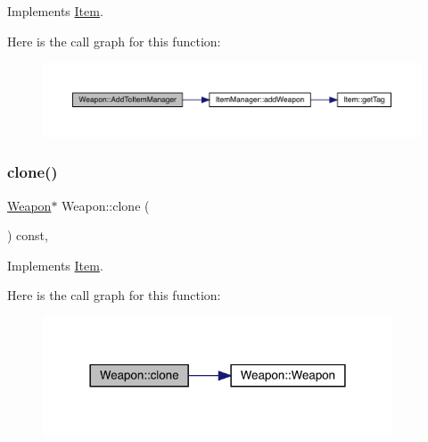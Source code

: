 Implements \mbox{\hyperlink{class_item_ae534538f3e77078f804acc742ef68521}{Item}}.

Here is the call graph for this function\+:
\nopagebreak
\begin{figure}[H]
\begin{center}
\leavevmode
\includegraphics[width=350pt]{db/de5/class_weapon_a241a74219d47374ffebebaad675dc250_cgraph}
\end{center}
\end{figure}
\mbox{\label{class_weapon_a4a914fa26d1d67a5d890252950f6b9be}} 
\subsubsection{\texorpdfstring{clone()}{clone()}}
{\footnotesize\ttfamily \mbox{\hyperlink{class_weapon}{Weapon}}$\ast$ Weapon\+::clone (\begin{DoxyParamCaption}{ }\end{DoxyParamCaption}) const\hspace{0.3cm}{\ttfamily [inline]}, {\ttfamily [virtual]}}



Implements \mbox{\hyperlink{class_item_a6d963581e2caad2e08979683a827f39f}{Item}}.

Here is the call graph for this function\+:\nopagebreak
\begin{figure}[H]
\begin{center}
\leavevmode
\includegraphics[width=294pt]{db/de5/class_weapon_a4a914fa26d1d67a5d890252950f6b9be_cgraph}
\end{center}
\end{figure}
\mbox{\label{class_weapon_a0755dc1352391eb484644ab4e4cf144d}} 
